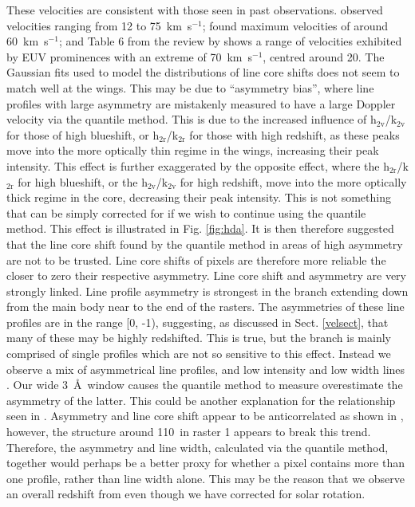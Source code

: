 These velocities are consistent with those seen in past observations. \cite{liggett_rotation_1984} observed velocities ranging from 12 to 75~km~s$^{-1}$; \cite{schmieder_reconstruction_2017} found maximum velocities of around 60~km~s$^{-1}$; and Table 6 from the review by \cite{labrosse_physics_2010} shows a range of velocities exhibited by EUV prominences with an extreme of 70~km~s$^{-1}$, centred around 20\kms. The Gaussian fits used to model the distributions of line core shifts does not seem to match well at the wings. This may be due to ``asymmetry bias'', where line profiles with large asymmetry are mistakenly measured to have a large Doppler velocity via the quantile method. This is due to the increased influence of h$_{2\text{v}}$/k$_{2\text{v}}$ for those of high blueshift, or h$_{2\text{r}}$/k$_{2\text{r}}$ for those with high redshift, as these peaks move into the more optically thin regime in the wings, increasing their peak intensity. This effect is further exaggerated by the opposite effect, where the h$_{2\text{r}}$/k$_{2\text{r}}$ for high blueshift, or the h$_{2\text{v}}$/k$_{2\text{v}}$ for high redshift, move into the more optically thick regime in the core, decreasing their peak intensity. This is not something that can be simply corrected for if we wish to continue using the quantile method. This effect is illustrated in Fig. \ref{fig:hda}. It is then therefore suggested that the line core shift found by the quantile method in areas of high asymmetry are not to be trusted. Line core shifts of pixels are therefore more reliable the closer to zero their respective asymmetry. Line core shift and asymmetry are very strongly linked. Line profile asymmetry is strongest in the branch extending down from the main body near to the end of the rasters. The asymmetries of these line profiles are in the range [0, -1), suggesting, as discussed in Sect. \ref{velsect}, that many of these may be highly redshifted. This is true, but the branch is mainly comprised of single profiles which are not so sensitive to this effect. Instead we observe a mix of asymmetrical line profiles, and low intensity and low width lines . Our wide 3~\AA\ window causes the quantile method to measure overestimate the asymmetry of the latter. This could be another explanation for the relationship seen in . Asymmetry and line core shift appear to be anticorrelated as shown in , however, the structure around 110~\arcsec in raster 1 appears to break this trend. Therefore, the asymmetry and line width, calculated via the quantile method, together would perhaps be a better proxy for whether a pixel contains more than one profile, rather than line width alone. This may be the reason that we observe an overall redshift from even though we have corrected for solar rotation. 

